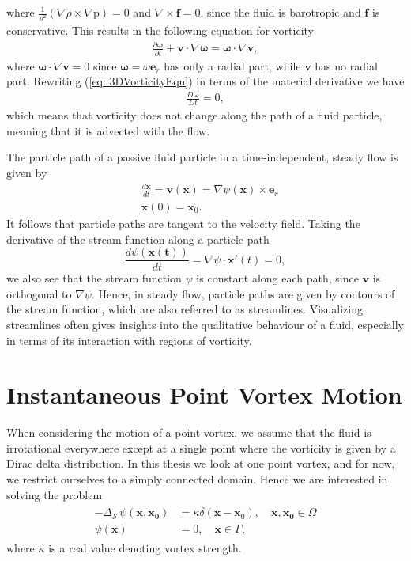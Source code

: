 \documentclass{sfuthesis}
\begin{document}
where $\frac{1}{\rho^2}\left(\nabla \rho \times \nabla \text{p} \right)=0$ and $\nabla \times \mathbf{f}=0$, since the fluid is barotropic \cite{Saff92} and $\mathbf{f}$ is conservative. 
This results in the following equation for vorticity
\begin{align}
	\frac{\partial \bm{\omega}}{\partial t} + \mathbf{v} \cdot \nabla \bm{\omega}=\bm{\omega} \cdot \nabla \mathbf{v}, \label{eq: 3DVorticityEqn} 
\end{align}
where $\bm{\omega} \cdot \nabla \mathbf{v}=0$ since $\bm{\omega}=\omega \mathbf{e}_r$ has only a radial part, while $\mathbf{v}$ has no radial part.
Rewriting (\ref{eq: 3DVorticityEqn}) in terms of the material derivative we have
\begin{align*}
	\frac{D\bm{\omega}}{Dt}=0,
\end{align*}
which means that vorticity does not change along the path of a fluid particle, meaning that it is advected with the flow. 

The particle path of a passive fluid particle in a time-independent, steady flow is given by 
\begin{align*}
	&\frac{d\mathbf{x}}{dt}=\mathbf{v}(\mathbf{x})=\nabla \psi(\mathbf{x}) \times {\mathbf{e}}_r \\
	&\mathbf{x}(0)=\mathbf{x}_0.
\end{align*}
It follows that particle paths are tangent to the velocity field. Taking the derivative of the stream function along a particle path 
\[\frac{d{\psi(\mathbf{x(t)})}}{dt}=\nabla \psi \cdot \mathbf{x}'(t)=0, \]
we also see that the stream function $\psi$ is constant along each path, since $\mathbf{v}$ is orthogonal to $\nabla \psi$. Hence, in steady flow,  particle paths are given by contours of the stream function, which are also referred to as streamlines. Visualizing streamlines often gives insights into the qualitative behaviour of a fluid, especially in terms of its interaction with regions of vorticity. 

\section{Instantaneous Point Vortex Motion}
\label{sec: InstPV}
When considering the motion of a point vortex, we assume that the fluid is irrotational everywhere except at a single point where the vorticity is given by a Dirac delta distribution. In this thesis we look at one point vortex, and for now, we restrict ourselves to a simply connected domain. 
Hence we are interested in solving the problem 
\begin{align}
	\begin{split}
	-{\Delta}_{\mathcal{S} \ } \psi({\mathbf{x}}, \mathbf{x_0})&=\kappa\delta(\mathbf{x}-{\mathbf{x}}_0), \quad \mathbf{x}, \mathbf{x_0} \in \Omega \label{eq: PointVortexStreamFnEqn}\\
	\psi(\mathbf{x})&=0, \quad \mathbf{x} \in \Gamma, 
	\end{split}
\end{align}
where $\kappa$ is a real value denoting vortex strength. 
\end{document}

